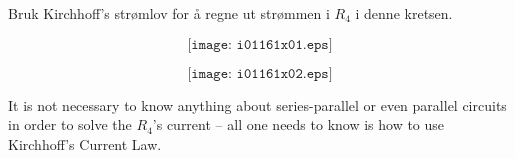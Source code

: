 

Bruk Kirchhoff's strømlov for å regne ut strømmen i $R_4$ i denne kretsen. 

$$\texttt{[image: i01161x01.eps]}$$







$$\texttt{[image: i01161x02.eps]}$$







It is not necessary to know anything about series-parallel or even parallel circuits in order to solve the $R_4$'s current -- all one needs to know is how to use Kirchhoff's Current Law.




